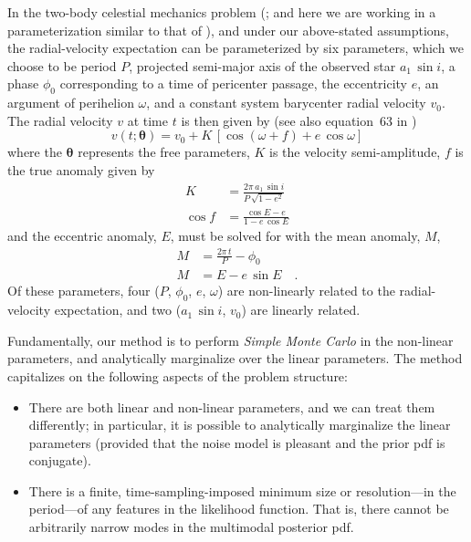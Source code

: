 \documentclass[manuscript, letterpaper]{aastex6}
\newcommand{\asini}{\ensuremath{a_1\,\sin i}}
\newcommand{\bs}[1]{\boldsymbol{#1}}
\begin{document}
In the two-body celestial mechanics problem (\citealt{Kepler:1609}; and here we
are working in a parameterization similar to that of \citealt{Murray:2010}), and
under our above-stated assumptions, the radial-velocity expectation can be
parameterized by six parameters, which we choose to be period $P$, projected
semi-major axis of the observed star $\asini$, a phase $\phi_0$ corresponding to
a time of pericenter passage, the eccentricity $e$, an argument of perihelion
$\omega$, and a constant system barycenter radial velocity $v_0$.
The radial velocity $v$ at time $t$ is then given by (see also
equation~63 in \citealt{Murray:2010})
\begin{equation}
  v(t;\bs{\theta}) = v_0 + K\,[\cos(\omega + f) + e\,\cos\omega]
\end{equation}
where the $\bs{\theta}$ represents the free parameters, $K$ is the velocity
semi-amplitude, $f$ is the true anomaly given by
\begin{align}
  K &= \frac{2\pi\,\asini}{P\,\sqrt{1-e^2}}\\
  \cos f &= \frac{\cos E - e}{1 - e\, \cos E}
\end{align}
and the eccentric anomaly, $E$, must be solved for with the mean
anomaly, $M$,
\begin{align}
  M &= \frac{2\pi\, t}{P} - \phi_0\\
  M &= E - e\,\sin E \quad .
\end{align}
Of these parameters, four ($P$, $\phi_0$, $e$, $\omega$) are
non-linearly related to the radial-velocity expectation, and two
($\asini$, $v_0$) are linearly related.

Fundamentally, our method is to perform \emph{Simple Monte Carlo} in
the non-linear parameters, and analytically marginalize over the linear
parameters.
The method capitalizes on the following aspects of the problem
structure:
\begin{itemize}\itemsep0ex
\item There are both linear and non-linear parameters, and we can
  treat them differently; in particular, it is possible to
  analytically marginalize the linear parameters (provided that the
  noise model is pleasant and the prior pdf is conjugate).
\item There is a finite, time-sampling-imposed minimum size or
  resolution---in the period---of any features in the
  likelihood function. That is, there cannot be arbitrarily narrow
  modes in the multimodal posterior pdf.
\end{itemize}
\end{document}
